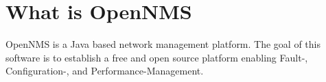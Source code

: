 \section{What is OpenNMS}
OpenNMS is a Java based network management platform. The goal of this software is to establish a free and open source platform enabling Fault-, Configuration-, and Performance-Management.